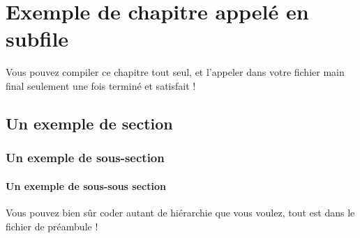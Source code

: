 \documentclass[../main.tex]{subfiles}
\begin{document}
\chapter{Exemple de chapitre appelé en subfile \label{chap:exemple}}

Vous pouvez compiler ce chapitre tout seul, et l'appeler dans votre fichier main final seulement une fois terminé et satisfait !

\section{\label{sec:exemple}Un exemple de section}
\subsection{\label{ssec:exemple}Un exemple de sous-section}
\subsubsection{\label{sssec:exemple}Un exemple de sous-sous section}
 Vous pouvez bien sûr coder autant de hiérarchie que vous voulez, tout est dans le fichier de préambule !
\end{document}
